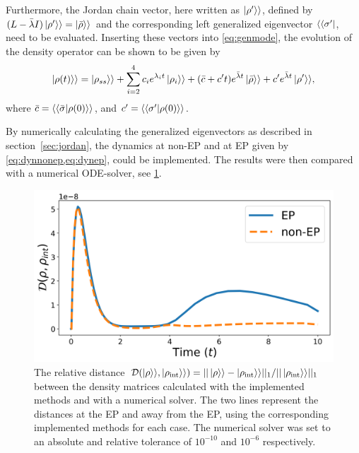 \documentclass[../main.tex]{subfiles}
\begin{document}
Furthermore, the Jordan chain vector, here written as $\ket{\rho'}\rangle$, defined by $(L - \bar\lambda I)\ket{\rho'}\rangle = \ket{\bar\rho}\rangle$ and the corresponding left generalized eigenvector $\langle\bra{\sigma'}$, need to be evaluated. Inserting these vectors into \cref{eq:genmode}, the evolution of the density operator can be shown to be given by
\begin{equation}\label{eq:dynep}
    \begin{aligned}
        \ket{\rho(t)}\rangle = \ket{\rho_{ss}}\rangle + \sum_{i=2}^4 c_i e^{\lambda_i t} \ket{\rho_i}\rangle  
                                + (\bar c + c't)e^{\bar \lambda t}\ket{\bar \rho}\rangle + c'e^{\bar\lambda t}\ket{\rho'}\rangle,
    \end{aligned}
\end{equation}
where $\bar c = \langle\braket{\bar\sigma|\rho(0)}\rangle$, and $c' = \langle\braket{\sigma'|\rho(0)}\rangle$.

By numerically calculating the generalized eigenvectors as described in section~\ref{sec:jordan}, the dynamics at non-EP and at EP given by \cref{eq:dynnonep,eq:dynep}, could be implemented. The results were then compared with a numerical ODE-solver, see \cref{fig:minevsint}.

\begin{figure}[H]
    \centering
    \includegraphics[width=0.7\linewidth]{figures/minevsint.png}
    \caption{The relative distance $\mathcal{D}(\ket{\rho}\rangle, \ket{\rho_\text{int}}\rangle) = ||\ket{\rho}\rangle - \ket{\rho_\text{int}}\rangle||_1/||\ket{\rho_\text{int}}\rangle||_1$ between the density matrices calculated with the implemented methods and with a numerical solver. The two lines represent the distances at the EP and away from the EP, using the corresponding implemented methods for each case. The numerical solver was set to an absolute and relative tolerance of $10^{-10}$ and $10^{-6}$ respectively.}
    \label{fig:minevsint}
\end{figure}
\end{document}
